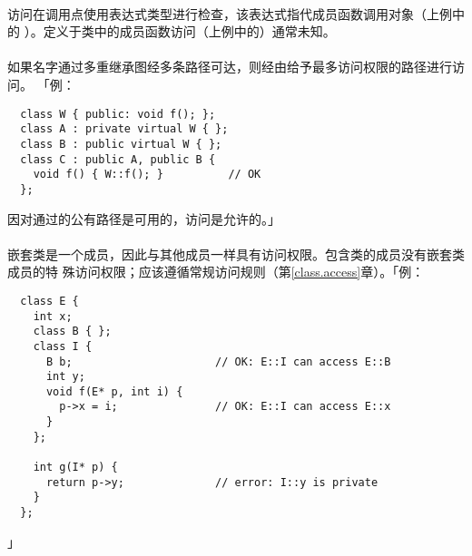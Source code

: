 \paragraph{}
访问在调用点使用表达式类型进行检查，该表达式指代成员函数调用对象（上例中的
）。定义于类中的成员函数访问（上例中的）通常未知。

\paragraph{}
如果名字通过多重继承图经多条路径可达，则经由给予最多访问权限的路径进行访问。
「例：
\begin{lstlisting}
  class W { public: void f(); };
  class A : private virtual W { };
  class B : public virtual W { };
  class C : public A, public B {
    void f() { W::f(); }          // OK
  };
\end{lstlisting}
因对通过的公有路径是可用的，访问是允许的。」

\paragraph{}
嵌套类是一个成员，因此与其他成员一样具有访问权限。包含类的成员没有嵌套类成员的特
殊访问权限；应该遵循常规访问规则（第\ref{class.access}章）。「例：
\begin{lstlisting}
  class E {
    int x;
    class B { };
    class I {
      B b;                      // OK: E::I can access E::B
      int y;
      void f(E* p, int i) {
        p->x = i;               // OK: E::I can access E::x
      }
    };

    int g(I* p) {
      return p->y;              // error: I::y is private
    }
  };
\end{lstlisting}」
